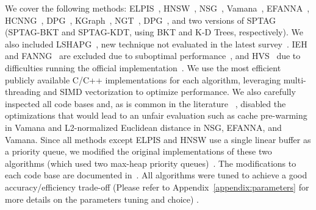  We cover the following methods: ELPIS~\cite{elpis}, HNSW~\cite{hnsw}, NSG~\cite{nsg}, Vamana~\cite{vamana}, EFANNA~\cite{efanna}, HCNNG~\cite{hcnng}, DPG~\cite{dpg}, KGraph~\cite{kgraph}, NGT~\cite{ngt_library}, DPG~\cite{dpg}, and two versions of SPTAG~\cite{SPTAG4} (SPTAG-BKT and SPTAG-KDT, using BKT and K-D Trees, respectively). We also included LSHAPG~\cite{lshapg}, new technique not evaluated in the latest survey~\cite{graph-survey-vldb}. IEH~\cite{ieh} and FANNG~\cite{fanng} are excluded due to suboptimal performance~\cite{graph-survey-vldb, nsg}, and HVS~\cite{hvs} due to difficulties running the official implementation~\cite{hvsgithub}. We use the most efficient publicly available C/C++ implementations for each algorithm, leveraging multi-threading and SIMD vectorization to optimize performance.  We also carefully inspected all code bases and, as is common in the literature ~\cite{graph-survey-vldb, diskanncode, nsgcode,ssgcode,ngtcode,sptagcode}, disabled the optimizations that would lead to an unfair evaluation such as cache pre-warming in Vamana and L2-normalized Euclidean distance in NSG, EFANNA, and Vamana. Since all methods except ELPIS and HNSW use a single linear buffer as a priority queue, we modified the original implementations of these two algorithms (which used two max-heap priority queues)~\cite{url/Elpis,url/hnsw}. The modifications to each code base are documented in~\cite{url/GASS}. All algorithms were tuned to achieve a good accuracy/efficiency trade-off (Please refer to Appendix~\ref{appendix:parameters} for more details on the parameters tuning and choice) . 

